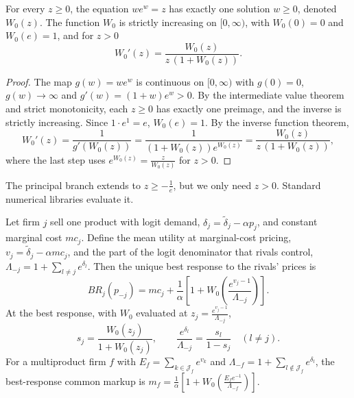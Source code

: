\begin{lemma}\label{lem:B-lambert}
For every $z \geq 0$, the equation $we^w = z$ has exactly one solution $w \geq 0$, denoted $W_0(z)$. The
function $W_0$ is strictly increasing on $[0, \infty)$, with $W_0(0) = 0$ and $W_0(e) = 1$, and for $z > 0$
\begin{equation}\label{eq:B-lambert-deriv}
W_0'(z) = \frac{W_0(z)}{z\,(1 + W_0(z))} .
\end{equation}
\end{lemma}

\begin{proof}
The map $g(w) = we^w$ is continuous on $[0, \infty)$ with $g(0) = 0$, $g(w) \to \infty$ and
$g'(w) = (1 + w)e^w > 0$. By the intermediate value theorem and strict monotonicity, each $z \geq 0$ has
exactly one preimage, and the inverse is strictly increasing. Since $1\cdot e^1 = e$, $W_0(e) = 1$. By the
inverse function theorem,
\begin{equation*}
W_0'(z) = \frac{1}{g'(W_0(z))} = \frac{1}{(1 + W_0(z))e^{W_0(z)}} = \frac{W_0(z)}{z\,(1 + W_0(z))},
\end{equation*}
where the last step uses $e^{W_0(z)} = \frac{z}{W_0(z)}$ for $z > 0$.
\end{proof}

The principal branch extends to $z \geq -\frac{1}{e}$, but we only need $z > 0$. Standard numerical libraries
evaluate it.

\begin{proposition}\label{prop:B-logit-br}
Let firm $j$ sell one product with logit demand, $\delta_j = \tilde\delta_j - \alpha p_j$, and constant marginal cost
$mc_j$. Define the mean utility at marginal-cost pricing, $v_j = \tilde\delta_j - \alpha mc_j$, and the part of the
logit denominator that rivals control, $\Lambda_{-j} = 1 + \sum_{l \neq j}e^{\delta_l}$. Then the unique best response
to the rivals' prices is
\begin{equation}\label{eq:B-logit-br-closed}
BR_j(p_{-j}) = mc_j + \frac{1}{\alpha}\left[1 + W_0\left(\frac{e^{v_j - 1}}{\Lambda_{-j}}\right)\right] .
\end{equation}
At the best response, with $W_0$ evaluated at $z_j = \frac{e^{v_j - 1}}{\Lambda_{-j}}$,
\begin{equation}\label{eq:B-br-identities}
s_j = \frac{W_0(z_j)}{1 + W_0(z_j)}, \qquad \frac{e^{\delta_l}}{\Lambda_{-j}} = \frac{s_l}{1 - s_j} \quad (l \neq j).
\end{equation}
For a multiproduct firm $f$ with $E_f = \sum_{k \in \mathcal{J}_f}e^{v_k}$ and $\Lambda_{-f} = 1 + \sum_{l \notin \mathcal{J}_f}e^{\delta_l}$,
the best-response common markup is $m_f = \frac{1}{\alpha}\left[1 + W_0\left(\frac{E_fe^{-1}}{\Lambda_{-f}}\right)\right]$.
\end{proposition}

